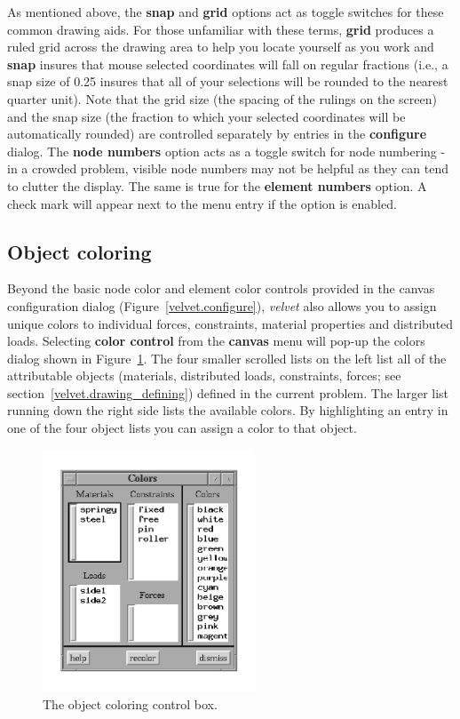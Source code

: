 As mentioned above, the {\bf snap} and {\bf grid} options act as toggle 
switches for these common drawing aids.  For those unfamiliar with these
terms, {\bf grid} produces a ruled grid across the drawing area to help you 
locate yourself as you work and {\bf snap} insures that mouse selected 
coordinates will fall on regular fractions (i.e., a snap size of 0.25
insures that all of your selections will be rounded to the nearest
quarter unit).  Note that the
grid size (the spacing of the rulings on the screen) and the snap size (the
fraction to which your selected coordinates will be automatically rounded) are
controlled separately by entries in the {\bf configure} dialog.  
The {\bf node numbers} option acts as a 
toggle switch for node numbering - in a crowded problem, visible node numbers 
may not be helpful as they can tend to clutter the display.  The same
is true for the {\bf element numbers} option.  
A check mark will appear next to the menu entry if the option is enabled.  

\subsection{Object coloring}
Beyond the basic node color and element color controls provided in the 
canvas configuration dialog (Figure~\ref{velvet.configure}), {\em velvet}
also allows you to assign unique colors to individual forces, constraints,
material properties and distributed loads.  Selecting {\bf color control}
from the {\bf canvas} menu will pop-up the colors dialog shown in 
Figure~\ref{velvet.colors}.  The four smaller scrolled lists on the left
list all of the attributable objects (materials, distributed loads, 
constraints, forces; see section~\ref{velvet.drawing_defining}) defined
in the current problem.  The larger list running down the right side lists
the available colors.  By highlighting an entry in one of the four object
lists you can assign a color to that object.  

\begin{figure}
\begin{center}
 \includegraphics[width=2.49in]{figures/velvet_colors}
\end{center}
\caption{The object coloring control box.}
\label{velvet.colors}
\end{figure}

